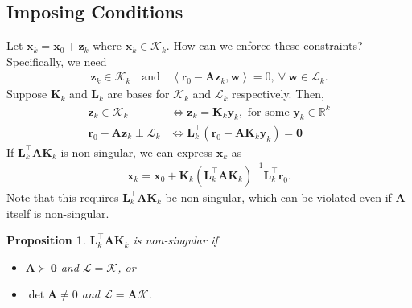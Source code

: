 \documentclass[12pt,a4paper]{article} %
\newtheorem*{proposition}{Proposition}
\begin{document}
\subsection{Imposing Conditions}
Let $\bm x_k = \bm x_0 + \bm z_k$ where $\bm x_k \in \mathcal K_k$.
How can we enforce these constraints? Specifically, we need
\begin{align*}
    \bm{z}_{k} \in \mathcal{K}_{k}
    \quad\text{and}\quad
    \left\langle\bm{r}_{0}-\mathbf{A} \bm{z}_{k}, \bm{w}\right\rangle= 0, ~\forall ~\bm{w} \in \mathcal{L}_{k}.
\end{align*}
Suppose $\mathbf K_k$ and $\mathbf L_k$ are bases for $\mathcal K_k$
and $\mathcal L_k$ respectively.  Then, 
\begin{align*}
    \bm{z}_{k} \in \mathcal{K}_{k} &\iff  \bm z_k = \mathbf K_k \bm y_k, \text{ for some } \bm y_k \in \mathbb R^k \\ 
    \bm r_0 - \mathbf A \bm z_k \perp \mathcal L_k &\iff \mathbf L_k^\top (\bm r_0 - \mathbf A \mathbf K_k \bm y_k) = \mathbf 0
\end{align*}
If $\mathbf L_k^\top \mathbf A \mathbf K_k$ is non-singular, we can express $\bm x_k$ as 
\begin{align*}
    \bm x_k = \bm x_0 + \mathbf K_k (\mathbf L_k^\top \mathbf A \mathbf K_k)^{-1} \mathbf L_k^\top \bm r_0.
\end{align*}
Note that this requires $\mathbf L_k^\top \mathbf A \mathbf K_k$ be non-singular, which 
can be violated even if $\mathbf A$ itself is non-singular.

\begin{proposition}
    $\mathbf L_k^\top \mathbf A \mathbf K_k$ is non-singular if 
    \begin{itemize}
        \item $\mathbf A \succ \bm 0$ and $\mathcal L = \mathcal K$, or 
        \item $\det \mathbf A \ne 0$ and $\mathcal L = \mathbf A \mathcal K$.
    \end{itemize}
\end{proposition}
\end{document}
